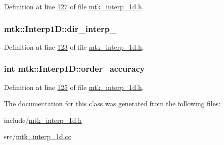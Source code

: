 Definition at line \hyperlink{mtk__interp__1d_8h_source_l00127}{127} of file \hyperlink{mtk__interp__1d_8h_source}{mtk\-\_\-interp\-\_\-1d.\-h}.

\hypertarget{classmtk_1_1Interp1D_a854e2c72f07c9fca4bbe32bfad2e0792}{
\subsubsection[{dir\-\_\-interp\-\_\-}]{ mtk\-::\-Interp1\-D\-::dir\-\_\-interp\-\_\-\hspace{0.3cm}{\ttfamily [private]}}}\label{classmtk_1_1Interp1D_a854e2c72f07c9fca4bbe32bfad2e0792}


Definition at line \hyperlink{mtk__interp__1d_8h_source_l00123}{123} of file \hyperlink{mtk__interp__1d_8h_source}{mtk\-\_\-interp\-\_\-1d.\-h}.

\hypertarget{classmtk_1_1Interp1D_a1ee8467d93536dc04240cd76f0d95c9c}{
\subsubsection[{order\-\_\-accuracy\-\_\-}]{\setlength{\rightskip}{0pt plus 5cm}int mtk\-::\-Interp1\-D\-::order\-\_\-accuracy\-\_\-\hspace{0.3cm}{\ttfamily [private]}}}\label{classmtk_1_1Interp1D_a1ee8467d93536dc04240cd76f0d95c9c}


Definition at line \hyperlink{mtk__interp__1d_8h_source_l00125}{125} of file \hyperlink{mtk__interp__1d_8h_source}{mtk\-\_\-interp\-\_\-1d.\-h}.



The documentation for this class was generated from the following files\-:\begin{DoxyCompactItemize}
\item 
include/\hyperlink{mtk__interp__1d_8h}{mtk\-\_\-interp\-\_\-1d.\-h}\item 
src/\hyperlink{mtk__interp__1d_8cc}{mtk\-\_\-interp\-\_\-1d.\-cc}\end{DoxyCompactItemize}
